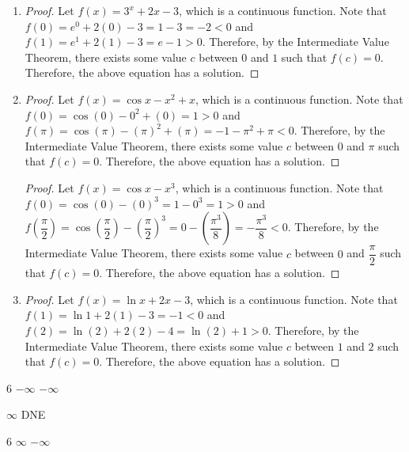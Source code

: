 \documentclass{book}
\begin{document}
\begin{appendices}
\begin{enumerate}[!HW!]
\begin{proof}
\end{proof}
\item
\begin{proof}
Let $f(x) = 3^x+2x-3$, which is a continuous function. Note that $f(0) = e^0 +2(0)-3 = 1-3 = -2 < 0$ and $f(1) = e^1+2(1) - 3 = e-1 > 0$. Therefore, by the Intermediate Value Theorem, there exists some value $c$ between $0$ and $1$ such that $f(c) = 0$. Therefore, the above equation has a solution.
\end{proof}
\item 
\begin{proof}
Let $f(x) = \cos x - x^2+x$, which is a continuous function. Note that $f(0) = \cos(0) - 0^2 +(0) = 1 > 0$ and $f(\pi) = \cos(\pi) - (\pi)^2+(\pi) =-1 -\pi^2+\pi < 0$. Therefore, by the Intermediate Value Theorem, there exists some value $c$ between $0$ and $\pi$ such that $f(c) = 0$. Therefore, the above equation has a solution.
\end{proof}
\itemspade 
\begin{proof}
Let $f(x) = \cos x - x^3$, which is a continuous function. Note that $f(0) = \cos(0) - (0)^3 = 1-0^3 = 1 > 0$ and $f\left(\dfrac{\pi}{2}\right) = \cos\left(\dfrac{\pi}{2}\right) - \left(\dfrac{\pi}{2}\right)^3 = 0 - \left(\dfrac{\pi^3}{8}\right) = -\dfrac{\pi^3}{8} < 0$. Therefore, by the Intermediate Value Theorem, there exists some value $c$ between $0$ and $\dfrac{\pi}{2}$ such that $f(c) = 0$. Therefore, the above equation has a solution.
\end{proof}
\item 
\begin{proof}
Let $f(x) = \ln x +2x -3$, which is a continuous function. Note that $f(1) = \ln 1 + 2(1) -3 = -1< 0$ and $f(2) = \ln(2) +2(2)-4 = \ln(2) +1 > 0$. Therefore, by the Intermediate Value Theorem, there exists some value $c$ between $1$ and $2$ such that $f(c) = 0$. Therefore, the above equation has a solution.
\end{proof}
\end{enumerate}
\vspace{-15 pt}
\rebootHW
\begin{enumerate}[!HW!]
\begin{multicols}{6}
\itemspade $-\infty$
\itemspade $-\infty$

\itemspade $\infty$
\itemspade DNE
\end{multicols}
\begin{multicols}{6}
\itemspade $\infty$
\itemspade $-\infty$


\end{multicols}
\end{enumerate}
\end{appendices}
\end{document}
